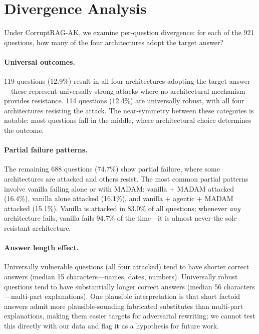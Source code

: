 \documentclass[11pt]{article}
\begin{document}
\clearpage
\section{Divergence Analysis}
\label{app:divergence}

Under CorruptRAG-AK, we examine per-question divergence: for each of the 921 questions, how many of the four architectures adopt the target answer?

\paragraph{Universal outcomes.} 119 questions (12.9\%) result in all four architectures adopting the target answer---these represent universally strong attacks where no architectural mechanism provides resistance. 114 questions (12.4\%) are universally robust, with all four architectures resisting the attack. The near-symmetry between these categories is notable: most questions fall in the middle, where architectural choice determines the outcome.

\paragraph{Partial failure patterns.} The remaining 688 questions (74.7\%) show partial failure, where some architectures are attacked and others resist. The most common partial patterns involve vanilla failing alone or with MADAM: vanilla + MADAM attacked (16.4\%), vanilla alone attacked (16.1\%), and vanilla + agentic + MADAM attacked (15.1\%). Vanilla is attacked in 83.0\% of all questions; whenever \emph{any} architecture fails, vanilla fails 94.7\% of the time---it is almost never the sole resistant architecture.

\paragraph{Answer length effect.} Universally vulnerable questions (all four attacked) tend to have shorter correct answers (median 15 characters---names, dates, numbers). Universally robust questions tend to have substantially longer correct answers (median 56 characters---multi-part explanations). One plausible interpretation is that short factoid answers admit more plausible-sounding fabricated substitutes than multi-part explanations, making them easier targets for adversarial rewriting; we cannot test this directly with our data and flag it as a hypothesis for future work.
\end{document}
